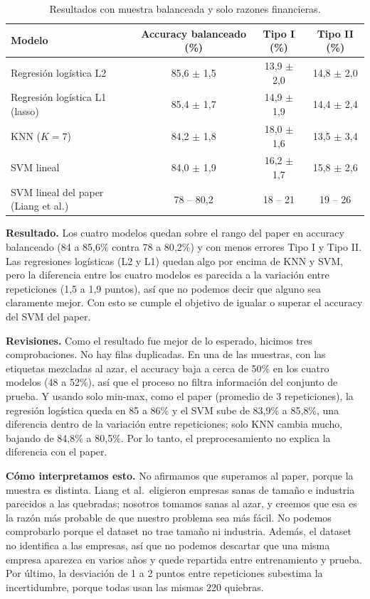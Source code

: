 \documentclass[11pt,a4paper]{article}
\begin{document}
\begin{table}[h]
\centering
\renewcommand{\arraystretch}{1.15}
\begin{tabular}{@{}lccc@{}}
\toprule
\textbf{Modelo} & \textbf{Accuracy balanceado (\%)} & \textbf{Tipo I (\%)} & \textbf{Tipo II (\%)} \\
\midrule
Regresión logística L2 & 85{,}6 $\pm$ 1{,}5 & 13{,}9 $\pm$ 2{,}0 & 14{,}8 $\pm$ 2{,}0 \\
Regresión logística L1 (lasso) & 85{,}4 $\pm$ 1{,}7 & 14{,}9 $\pm$ 1{,}9 & 14{,}4 $\pm$ 2{,}4 \\
KNN ($K=7$) & 84{,}2 $\pm$ 1{,}8 & 18{,}0 $\pm$ 1{,}6 & 13{,}5 $\pm$ 3{,}4 \\
SVM lineal & 84{,}0 $\pm$ 1{,}9 & 16{,}2 $\pm$ 1{,}7 & 15{,}8 $\pm$ 2{,}6 \\
\midrule
SVM lineal del paper (Liang et al.) & 78 -- 80{,}2 & 18 -- 21 & 19 -- 26 \\
\bottomrule
\end{tabular}
\caption{Resultados con muestra balanceada y solo razones financieras.}
\label{tab:res}
\end{table}

\textbf{Resultado.} Los cuatro modelos quedan sobre el rango del paper en accuracy balanceado (84 a 85{,}6\% contra 78 a 80{,}2\%) y con menos errores Tipo I y Tipo II. Las regresiones logísticas (L2 y L1) quedan algo por encima de KNN y SVM, pero la diferencia entre los cuatro modelos es parecida a la variación entre repeticiones (1{,}5 a 1{,}9 puntos), así que no podemos decir que alguno sea claramente mejor. Con esto se cumple el objetivo de igualar o superar el accuracy del SVM del paper.

\textbf{Revisiones.} Como el resultado fue mejor de lo esperado, hicimos tres comprobaciones. No hay filas duplicadas. En una de las muestras, con las etiquetas mezcladas al azar, el accuracy baja a cerca de 50\% en los cuatro modelos (48 a 52\%), así que el proceso no filtra información del conjunto de prueba. Y usando solo min-max, como el paper (promedio de 3 repeticiones), la regresión logística queda en 85 a 86\% y el SVM sube de 83{,}9\% a 85{,}8\%, una diferencia dentro de la variación entre repeticiones; solo KNN cambia mucho, bajando de 84{,}8\% a 80{,}5\%. Por lo tanto, el preprocesamiento no explica la diferencia con el paper.

\textbf{Cómo interpretamos esto.} No afirmamos que superamos al paper, porque la muestra es distinta. Liang et al.\ eligieron empresas sanas de tamaño e industria parecidos a las quebradas; nosotros tomamos sanas al azar, y creemos que esa es la razón más probable de que nuestro problema sea más fácil. No podemos comprobarlo porque el dataset no trae tamaño ni industria. Además, el dataset no identifica a las empresas, así que no podemos descartar que una misma empresa aparezca en varios años y quede repartida entre entrenamiento y prueba. Por último, la desviación de 1 a 2 puntos entre repeticiones subestima la incertidumbre, porque todas usan las mismas 220 quiebras.
\end{document}

